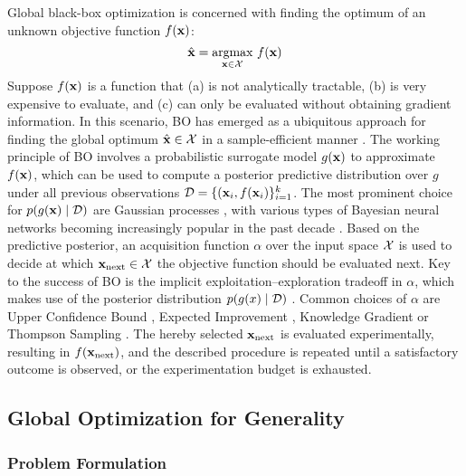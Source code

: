 Global black-box optimization is concerned with finding the optimum of an unknown objective function $f({\mathbf{x}})$: 
\begin{equation}
\hat{{\mathbf{x}}} = \underset{{\mathbf{x}} \in {\mathcal{X}}}{\text{argmax}} \ f({\mathbf{x}})
\end{equation}
%
Suppose $f({\mathbf{x}})$ is a function that (a) is not analytically tractable, (b) is very expensive to evaluate, and (c) can only be evaluated without obtaining gradient information. In this scenario, BO has emerged as a ubiquitous approach for finding the global optimum $\hat{{\mathbf{x}}} \in {\mathcal{X}}$ in a sample-efficient manner \citep{garnett_roman_bayesian_2023}. 
The working principle of BO involves a probabilistic surrogate model $g({\mathbf{x}})$ to approximate $f({\mathbf{x}})$, which can be used to compute a posterior predictive distribution over $g$ under all previous observations ${\mathcal{D}} = \{({\mathbf{x}}_i, f({\mathbf{x}}_i)\}_{i=1}^k$. 
The most prominent choice for $p(g({\mathbf{x}}) \mid {\mathcal{D}})$ are Gaussian processes \citep[GPs;][]{rasmussen_gaussian_2006}, with various types of Bayesian neural networks becoming increasingly popular in the past decade \citep{hernandez-lobato_parallel_2017, kristiadi_promises_2023, li_study_2024, kristiadi_sober_2024}. 
Based on the predictive posterior, an acquisition function $\alpha$ over the input space ${\mathcal{X}}$ is used to decide at which ${\mathbf{x}}_\text{next} \in {\mathcal{X}}$ the objective function should be evaluated next. 
Key to the success of BO is the implicit exploitation–exploration tradeoff in $\alpha$, which makes use of the posterior distribution $p(g(x) \mid {\mathcal{D}})$ \citep{mockus_bayesian_1975}.
Common choices of $\alpha$ are Upper Confidence Bound \citep[UCB;][]{kaelbling_associative_1994, kaelbling_associative_1994-1, agrawal_sample_1995}, Expected Improvement \citep[EI;][]{jones_efficient_1998}, Knowledge Gradient \citep{gupta_bayesian_1994, frazier_knowledge-gradient_2008, frazier_knowledge-gradient_2009} or Thompson Sampling \citep[TS;][]{thompson_likelihood_1933}.
The hereby selected ${\mathbf{x}}_\text{next}$ is evaluated experimentally, resulting in \(f({\mathbf{x}}_\text{next})\), and the described procedure is repeated until a satisfactory outcome is observed, or the experimentation budget is exhausted.

\subsection{Global Optimization for Generality} \label{subsec:Generality-BO}

\subsubsection{Problem Formulation} \label{subsubsec:algo_outline}

